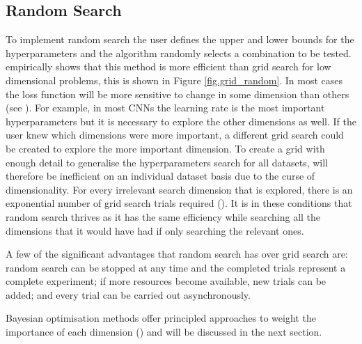 \subsection{Random Search}
To implement random search the user defines the upper and lower bounds for the hyperparameters and the algorithm randomly selects a combination to be tested. \citet{bergstra12} empirically shows that this method is more efficient than grid search for low dimensional problems, this is shown in Figure \ref{fig.grid_random}. In most cases the loss function will be more sensitive to change in some dimension than others (see \cite{caflisch97}). For example, in most CNNs the learning rate is the most important hyperparameters but it is necessary to explore the other dimensions as well. If the user knew which dimensions were more important, a different grid search could be created to explore the more important dimension. To create a grid with enough detail to generalise the hyperparameters search for all datasets, will therefore be inefficient on an individual dataset basis due to the curse of dimensionality. For every irrelevant search dimension that is explored, there is an exponential number of grid search trials required (\cite{bergstra12}). It is in these conditions that random search thrives as it has the same efficiency while searching all the dimensions that it would have had if only searching the relevant ones.
\par
A few of the significant advantages that random search has over grid search are: random search can be stopped at any time and the completed trials represent a complete experiment; if more resources become available, new trials can be added; and every trial can be carried out asynchronously. 
\par
Bayesian optimisation methods offer principled approaches to weight the importance of each dimension (\cite{bergstra12}) and will be discussed in the next section.
